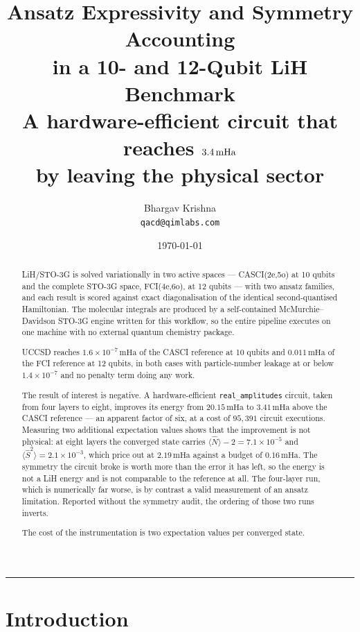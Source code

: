 \documentclass[11pt,a4paper]{article}
\title{\vspace{-1.1cm}\textbf{Ansatz Expressivity and Symmetry Accounting\\
in a 10- and 12-Qubit LiH Benchmark}\\[0.4em]
\large A hardware-efficient circuit that reaches $3.4\mHa$\\
by leaving the physical sector}
\author{Bhargav Krishna\\\small\texttt{qacd@qimlabs.com}}
\date{\today}
\newcommand{\mHa}{\ensuremath{\,\mathrm{mHa}}}
\newcommand{\Ssq}{\ensuremath{\langle \hat{S}^2 \rangle}}
\newcommand{\Nop}{\ensuremath{\langle \hat{N} \rangle}}
\newcommand{\code}[1]{\texttt{\small #1}}
\begin{document}
\maketitle
\thispagestyle{fancy}

\begin{abstract}
\noindent
LiH/STO-3G is solved variationally in two active spaces --- CASCI(2e,5o) at 10
qubits and the complete STO-3G space, FCI(4e,6o), at 12 qubits --- with two
ansatz families, and each result is scored against exact diagonalisation of the
identical second-quantised Hamiltonian. The molecular integrals are produced by
a self-contained McMurchie--Davidson STO-3G engine written for this workflow,
so the entire pipeline executes on one machine with no external quantum
chemistry package.

UCCSD reaches $1.6\times10^{-7}\mHa$ of the CASCI reference at 10 qubits and
$0.011\mHa$ of the FCI reference at 12 qubits, in both cases with particle-number
leakage at or below $1.4\times10^{-7}$ and no penalty term doing any work.

The result of interest is negative. A hardware-efficient \code{real\_amplitudes}
circuit, taken from four layers to eight, improves its energy from $20.15\mHa$
to $3.41\mHa$ above the CASCI reference --- an apparent factor of six, at a cost
of $95{,}391$ circuit executions. Measuring two additional expectation values
shows that the improvement is not physical: at eight layers the converged state
carries $\Nop - 2 = 7.1\times10^{-5}$ and $\Ssq = 2.1\times10^{-3}$, which price
out at $2.19\mHa$ against a budget of $0.16\mHa$. The symmetry the circuit broke
is worth more than the error it has left, so the energy is not a LiH energy and
is not comparable to the reference at all. The four-layer run, which is
numerically far worse, is by contrast a valid measurement of an ansatz
limitation. Reported without the symmetry audit, the ordering of those two runs
inverts.

The cost of the instrumentation is two expectation values per converged state.
\end{abstract}

\tableofcontents
\vspace{0.6em}
\hrule
\vspace{0.8em}

\section{Introduction}
\end{document}
